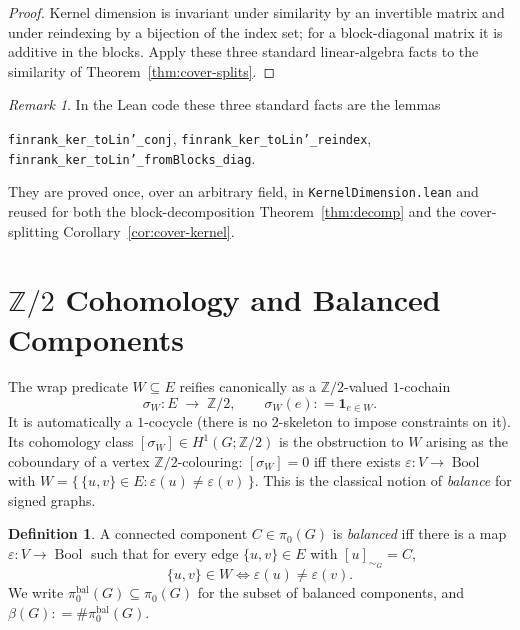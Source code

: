 \documentclass[11pt,a4paper]{amsart}
\theoremstyle{plain}
\theoremstyle{definition}
\newtheorem{definition}[theorem]{Definition}
\theoremstyle{remark}
\newtheorem{remark}[theorem]{Remark}
\newcommand{\ZZ}{\mathbb{Z}}
\newcommand{\comp}{\pi_0}
\newcommand{\defeq}{\mathrel{\mathop:}=}
\begin{document}
\begin{proof}
Kernel dimension is invariant under similarity by an invertible
matrix and under reindexing by a bijection of the index set; for
a block-diagonal matrix it is additive in the blocks. Apply these
three standard linear-algebra facts to the similarity of
Theorem~\ref{thm:cover-splits}.
\end{proof}

\begin{remark}
In the Lean code these three standard facts are the lemmas
\begin{center}
  \texttt{finrank\_ker\_toLin'\_conj},\quad
  \texttt{finrank\_ker\_toLin'\_reindex},\quad
  \texttt{finrank\_ker\_toLin'\_fromBlocks\_diag}.
\end{center}
They are proved once, over an arbitrary field, in
\texttt{KernelDimension.lean} and reused for both the
block-decomposition Theorem~\ref{thm:decomp} and the
cover-splitting Corollary~\ref{cor:cover-kernel}.
\end{remark}

\section{$\ZZ/2$ Cohomology and Balanced Components}\label{sec:coho}

The wrap predicate $W\subseteq E$ reifies canonically as a
$\ZZ/2$-valued $1$-cochain
\[
  \sigma_W : E \;\longrightarrow\; \ZZ/2,\qquad
  \sigma_W(e) \defeq \mathbf{1}_{e\in W}.
\]
It is automatically a $1$-cocycle (there is no $2$-skeleton to
impose constraints on it). Its cohomology class
$[\sigma_W]\in H^1(G;\ZZ/2)$ is the obstruction to
$W$ arising as the coboundary of a vertex $\ZZ/2$-colouring:
$[\sigma_W]=0$ iff there exists $\varepsilon:V\to\operatorname{Bool}$
with $W = \{\,\{u,v\}\in E : \varepsilon(u)\ne \varepsilon(v)\,\}$.
This is the classical notion of \emph{balance} for signed graphs.

\begin{definition}\label{def:balanced}
A connected component $C\in\comp(G)$ is \emph{balanced} iff there
is a map $\varepsilon:V\to\operatorname{Bool}$ such that for every
edge $\{u,v\}\in E$ with $[u]_{\sim_G} = C$,
\[
  \{u,v\}\in W \iff \varepsilon(u)\ne \varepsilon(v).
\]
We write $\comp^{\mathrm{bal}}(G)\subseteq \comp(G)$ for the
subset of balanced components, and
$\beta(G)\defeq \#\comp^{\mathrm{bal}}(G)$.
\end{definition}
\end{document}
